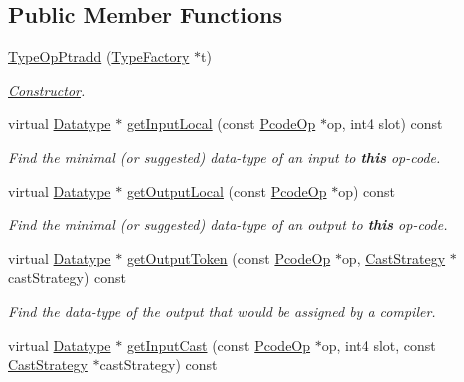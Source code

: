\subsection*{Public Member Functions}
\begin{DoxyCompactItemize}
\item 
\mbox{\hyperlink{class_type_op_ptradd_ac65fe66a995a40c013c5cde57eeca6d6}{Type\+Op\+Ptradd}} (\mbox{\hyperlink{class_type_factory}{Type\+Factory}} $\ast$t)
\begin{DoxyCompactList}\small\item\em \mbox{\hyperlink{class_constructor}{Constructor}}. \end{DoxyCompactList}\item 
virtual \mbox{\hyperlink{class_datatype}{Datatype}} $\ast$ \mbox{\hyperlink{class_type_op_ptradd_a80258521d1b2a930d1472fcf1b6c53eb}{get\+Input\+Local}} (const \mbox{\hyperlink{class_pcode_op}{Pcode\+Op}} $\ast$op, int4 slot) const
\begin{DoxyCompactList}\small\item\em Find the minimal (or suggested) data-\/type of an input to {\bfseries{this}} op-\/code. \end{DoxyCompactList}\item 
virtual \mbox{\hyperlink{class_datatype}{Datatype}} $\ast$ \mbox{\hyperlink{class_type_op_ptradd_af8fe09a62086231038f5c181dc0d0a03}{get\+Output\+Local}} (const \mbox{\hyperlink{class_pcode_op}{Pcode\+Op}} $\ast$op) const
\begin{DoxyCompactList}\small\item\em Find the minimal (or suggested) data-\/type of an output to {\bfseries{this}} op-\/code. \end{DoxyCompactList}\item 
virtual \mbox{\hyperlink{class_datatype}{Datatype}} $\ast$ \mbox{\hyperlink{class_type_op_ptradd_a129573eb45f5e95826e557032aa785a1}{get\+Output\+Token}} (const \mbox{\hyperlink{class_pcode_op}{Pcode\+Op}} $\ast$op, \mbox{\hyperlink{class_cast_strategy}{Cast\+Strategy}} $\ast$cast\+Strategy) const
\begin{DoxyCompactList}\small\item\em Find the data-\/type of the output that would be assigned by a compiler. \end{DoxyCompactList}\item 
virtual \mbox{\hyperlink{class_datatype}{Datatype}} $\ast$ \mbox{\hyperlink{class_type_op_ptradd_ae946ae561b73a60e3df2be75280cf501}{get\+Input\+Cast}} (const \mbox{\hyperlink{class_pcode_op}{Pcode\+Op}} $\ast$op, int4 slot, const \mbox{\hyperlink{class_cast_strategy}{Cast\+Strategy}} $\ast$cast\+Strategy) const

\end{DoxyCompactItemize}

